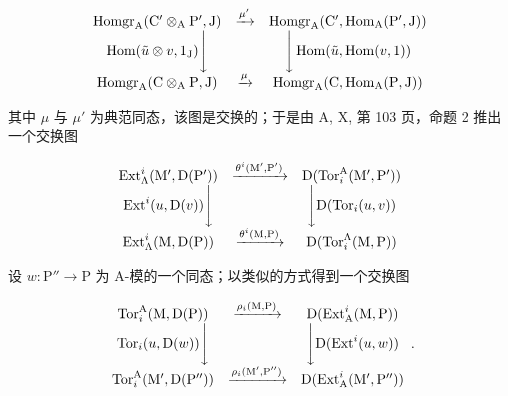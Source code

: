 \[
\begin{array}{c c c} \operatorname{Homgr} _ {\mathrm{A}} (\mathrm{C} ^ {\prime} \otimes_ {\mathrm{A}} \mathrm{P} ^ {\prime}, \mathrm{J}) & \xrightarrow {\mu^ {\prime}} & \operatorname{Homgr} _ {\mathrm{A}} (\mathrm{C} ^ {\prime}, \operatorname{Hom} _ {\mathrm{A}} (\mathrm{P} ^ {\prime}, \mathrm{J})) \\ \operatorname{Hom} (\tilde {u} \otimes v, 1 _ {\mathrm{J}}) \Bigg \downarrow & & \Bigg \downarrow \operatorname{Hom} (\tilde {u}, \operatorname{Hom} (v, 1)) \\ \operatorname{Homgr} _ {\mathrm{A}} (\mathrm{C} \otimes_ {\mathrm{A}} \mathrm{P}, \mathrm{J}) & \xrightarrow {\mu} & \operatorname{Homgr} _ {\mathrm{A}} (\mathrm{C}, \operatorname{Hom} _ {\mathrm{A}} (\mathrm{P}, \mathrm{J})) \end{array}
\]

其中 \(\mu\) 与 \(\mu'\) 为典范同态，该图是交换的；于是由 A, X, 第 103 页，命题 2 推出一个交换图

\[
\begin{array}{c c c} \operatorname{Ext} _ {\Lambda} ^ {i} (\mathrm{M} ^ {\prime}, \mathrm{D} (\mathrm{P} ^ {\prime})) & \xrightarrow {\theta^ {i} (\mathrm{M} ^ {\prime} , \mathrm{P} ^ {\prime})} & \mathrm{D} (\operatorname{Tor} _ {i} ^ {\mathrm{A}} (\mathrm{M} ^ {\prime}, \mathrm{P} ^ {\prime})) \\ \operatorname{Ext} ^ {i} (u, \mathrm{D} (v)) \Bigg \downarrow & & \Bigg \downarrow \mathrm{D} (\operatorname{Tor} _ {i} (u, v)) \\ \operatorname{Ext} _ {\Lambda} ^ {i} (\mathrm{M}, \mathrm{D} (\mathrm{P})) & \xrightarrow {\theta^ {i} (\mathrm{M} , \mathrm{P})} & \mathrm{D} (\operatorname{Tor} _ {i} ^ {\Lambda} (\mathrm{M}, \mathrm{P})) \end{array}
\]

设 \(w: \mathrm{P}'' \to \mathrm{P}\) 为 A-模的一个同态；以类似的方式得到一个交换图

\[
\begin{array}{c c c} \operatorname{Tor} _ {i} ^ {\mathrm{A}} (\mathrm{M}, \mathrm{D} (\mathrm{P})) & \xrightarrow {\rho_ {i} (\mathrm{M} , \mathrm{P})} & \mathrm{D} (\operatorname{Ext} _ {\mathrm{A}} ^ {i} (\mathrm{M}, \mathrm{P})) \\ \operatorname{Tor} _ {i} (u, \mathrm{D} (w)) \Bigg \downarrow & & \Bigg \downarrow \mathrm{D} (\operatorname{Ext} ^ {i} (u, w)) \\ \operatorname{Tor} _ {i} ^ {\mathrm{A}} (\mathrm{M} ^ {\prime}, \mathrm{D} (\mathrm{P} ^ {\prime \prime})) & \xrightarrow {\rho_ {i} (\mathrm{M} ^ {\prime} , \mathrm{P} ^ {\prime \prime})} & \mathrm{D} (\operatorname{Ext} _ {\mathrm{A}} ^ {i} (\mathrm{M} ^ {\prime}, \mathrm{P} ^ {\prime \prime})) \end{array} .
\]

